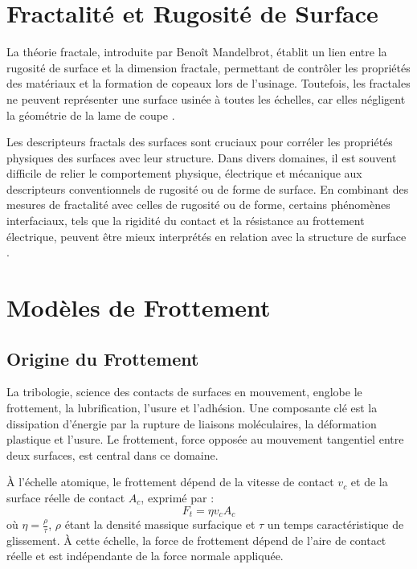 \section{Fractalit\'e et Rugosit\'e de Surface}

La théorie fractale, introduite par Benoît Mandelbrot, établit un lien entre la rugosité de surface et la dimension fractale, permettant de contrôler les propriétés des matériaux et la formation de copeaux lors de l'usinage. Toutefois, les fractales ne peuvent représenter une surface usinée à toutes les échelles, car elles négligent la géométrie de la lame de coupe \cite{davim2010surface, bez2011duality}.

Les descripteurs fractals des surfaces sont cruciaux pour corréler les propriétés physiques des surfaces avec leur structure. Dans divers domaines, il est souvent difficile de relier le comportement physique, électrique et mécanique aux descripteurs conventionnels de rugosité ou de forme de surface. En combinant des mesures de fractalit\'e avec celles de rugosité ou de forme, certains phénomènes interfaciaux, tels que la rigidité du contact et la résistance au frottement électrique, peuvent être mieux interprétés en relation avec la structure de surface \cite{davim2010surface, bez2011duality}.

\section{Modèles de Frottement}

\subsection{Origine du Frottement}
La tribologie, science des contacts de surfaces en mouvement, englobe le frottement, la lubrification, l’usure et l’adhésion. Une composante clé est la dissipation d’énergie par la rupture de liaisons moléculaires, la déformation plastique et l’usure. Le frottement, force opposée au mouvement tangentiel entre deux surfaces, est central dans ce domaine.

À l’échelle atomique, le frottement dépend de la vitesse de contact \(v_c\) et de la surface réelle de contact \(A_c\), exprimé par :
\begin{equation}
F_t = \eta v_c A_c \label{eq:frottement_atomique}
\end{equation}
où \(\eta = \frac{\rho}{\tau}\), \(\rho\) étant la densité massique surfacique et \(\tau\) un temps caractéristique de glissement. À cette échelle, la force de frottement dépend de l’aire de contact réelle et est indépendante de la force normale appliquée.

